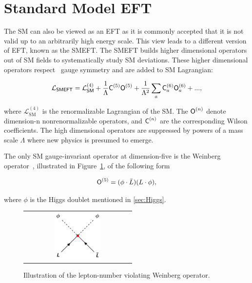 \section{Standard Model EFT}
\label{sec:SMEFT}

The \ac{SM} can also be viewed as an \ac{EFT} as it is commonly accepted that it is not valid up to an arbitrarily high energy scale. This view leads to a different version of \ac{EFT}, known as the \ac{SMEFT}. The \ac{SMEFT} builds higher dimensional operators out of \ac{SM} fields to systematically study \ac{SM} deviations. These higher dimensional operators respect \sm~gauge symmetry and are added to \ac{SM} Lagrangian:

\begin{equation}
\label{eq:SMEFT}
\mathcal{L}_{\textsf{SMEFT}}=\mathcal{L}_{\textsf{SM}}^{(4)} + \frac{1}{\mathrm{\Lambda}}\textsf{C}^{(5)}_{}\textsf{O}^{(5)}_{}+ \frac{1}{\mathrm{\Lambda}^2}\sum_{a}\textsf{C}^{(6)}_{a}\textsf{O}^{(6)}_{a} + ...,
\end{equation}  

where $\mathcal{L}_{\text{SM}}^{(4)}$ is the renormalizable Lagrangian of the \ac{SM}. The $\textsf{O}^{(n)}_{}$ denote dimension-n nonrenormalizable operators, and $\textsf{C}^{(n)}_{}$ are the corresponding Wilson coefficients. The high dimensional operators are suppressed by powers of a mass scale $\Lambda$ where new physics is presumed to emerge. 

The only \ac{SM} gauge-invariant operator at dimension-five is the Weinberg operator~\cite{Weinberg:1979sa}, illustrated in Figure~\ref{fig:Dim5}, of the following form

\begin{equation}
\textsf{O}^{(5)}_{}=(\phi\cdot\bar{L})(L\cdot\phi),
\end{equation}

where $\phi$ is the Higgs doublet mentioned in \autoref{sec:Higgs}. 

\begin{figure}[tbh!]
 \begin{center}
 \begin{tabular}{c}
 \includegraphics[width=0.45\textwidth]{figures/Part1/EFT/Dim5}
 \end{tabular}
 \caption{Illustration of the lepton-number violating Weinberg operator.}
 \label{fig:Dim5}
 \end{center}
\end{figure}

